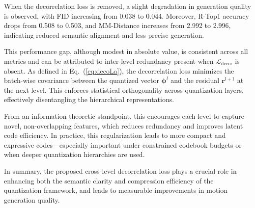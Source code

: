 \documentclass[a4paper,12pt]{article}
\begin{document}
When the decorrelation loss is removed, a slight degradation in generation quality is observed, with FID increasing from 0.038 to 0.044. Moreover, R-Top1 accuracy drops from 0.508 to 0.503, and MM-Distance increases from 2.992 to 2.996, indicating reduced semantic alignment and less precise generation.

This performance gap, although modest in absolute value, is consistent across all metrics and can be attributed to inter-level redundancy present when $\mathcal{L}_{\text{decor}}$ is absent. As defined in Eq.~(\ref{eq:decoLa}), the decorrelation loss minimizes the batch-wise covariance between the quantized vector $\boldsymbol{\phi}^l$ and the residual $\mathbf{r}^{l+1}$ at the next level. This enforces statistical orthogonality across quantization layers, effectively disentangling the hierarchical representations.

From an information-theoretic standpoint, this encourages each level to capture novel, non-overlapping features, which reduces redundancy and improves latent code efficiency. In practice, this regularization leads to more compact and expressive codes—especially important under constrained codebook budgets or when deeper quantization hierarchies are used.

In summary, the proposed cross-level decorrelation loss plays a crucial role in enhancing both the semantic clarity and compression efficiency of the quantization framework, and leads to measurable improvements in motion generation quality.



\end{document}
